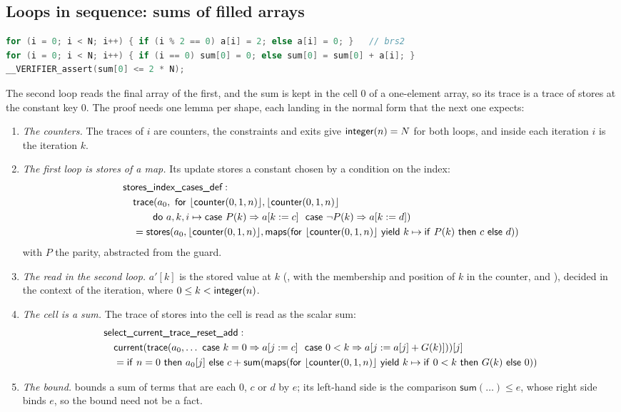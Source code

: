 \subsection{Loops in sequence: sums of filled arrays}\label{sec:brs2}
\begin{lstlisting}[language=C]
for (i = 0; i < N; i++) { if (i % 2 == 0) a[i] = 2; else a[i] = 0; }   // brs2
for (i = 0; i < N; i++) { if (i == 0) sum[0] = 0; else sum[0] = sum[0] + a[i]; }
__VERIFIER_assert(sum[0] <= 2 * N);
\end{lstlisting}
The second loop reads the final array of the first, and the sum is kept in the cell $0$ of a one-element array, so
its trace is a trace of stores at the constant key $0$. The proof needs one lemma per shape, each landing in the
normal form that the next one expects:
\begin{enumerate}[nosep]
\item \emph{The counters.} The traces of $i$ are counters, the constraints and exits give $\mathsf{integer}(n) = N$ for both
  loops, and inside each iteration $i$ is the iteration $k$.
\item \emph{The first loop is stores of a map.} Its update stores a constant chosen by a condition on the index:
\begin{align*}
  &\lemma{stores\_index\_cases\_def}:\\
  &\quad \mathsf{trace}(a_0,\ \mathsf{for}\ \bl{\cnt(0, 1, n)}, \bl{\cnt(0, 1, n)}\\
  &\qquad\quad \mathsf{do}\ a, k, i \mapsto \upd{P(k)}{a[k := c]}\ \ \upd{\neg P(k)}{a[k := d]})\\
  &\quad = \mathsf{stores}(a_0, \bl{\cnt(0, 1, n)}, \mapc{\bl{\cnt(0, 1, n)}}{k \mapsto \ite{P(k)}{c}{d}})
\end{align*}
  with $P$ the parity, abstracted from the guard.
\item \emph{The read in the second loop.} $a'[k]$ is the stored value at $k$ (, with the
  membership and position of $k$ in the counter,  and ), decided
  in the context of the iteration, where $0 \le k < \mathsf{integer}(n)$.
\item \emph{The cell is a sum.} The trace of stores into the cell is read as the scalar sum:
\begin{align*}
  &\lemma{select\_current\_trace\_reset\_add}:\\
  &\quad \cur(\mathsf{trace}(a_0, \ldots\ \upd{k = 0}{a[j := c]}\ \ \upd{0 < k}{a[j := a[j] + G(k)]}))[j]\\
  &\quad = \ite{n = 0}{a_0[j]}{c + \mathsf{sum}(\mapc{\bl{\cnt(0, 1, n)}}{k \mapsto \ite{0 < k}{G(k)}{0}})}
\end{align*}
\item \emph{The bound.}  bounds a sum of terms that are each $0$, $c$ or $d$ by $e$; its
  left-hand side is the comparison $\mathsf{sum}(\ldots) \le e$, whose right side binds $e$, so the bound need not be
  a fact.
\end{enumerate}
